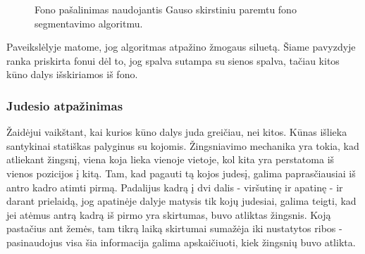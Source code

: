 \documentclass{VUMIFPSbakalaurinis}
\begin{document}
\begin{figure}[H]
    \centering
    \qquad
    \caption{Fono pašalinimas naudojantis Gauso skirstiniu paremtu fono segmentavimo algoritmu.}
    \label{fig:example}
\end{figure}


Paveikslėlyje matome, jog algoritmas atpažino žmogaus siluetą. Šiame pavyzdyje ranka priskirta fonui dėl to, jog spalva sutampa su sienos spalva, tačiau kitos kūno dalys išskiriamos iš fono.

\subsubsection{Judesio atpažinimas}

Žaidėjui vaikštant, kai kurios kūno dalys juda greičiau, nei kitos. Kūnas išlieka santykinai statiškas palyginus su kojomis. Žingsniavimo mechanika yra tokia, kad atliekant žingsnį, viena koja lieka vienoje vietoje, kol kita yra perstatoma iš vienos pozicijos į kitą. Tam, kad pagauti tą kojos judesį, galima paprasčiausiai iš antro kadro atimti pirmą. Padalijus kadrą į dvi dalis - viršutinę ir apatinę - ir darant prielaidą, jog apatinėje dalyje matysis tik kojų judesiai, galima teigti, kad jei atėmus antrą kadrą iš pirmo yra skirtumas, buvo atliktas žingsnis. Koją pastačius ant žemės, tam tikrą laiką skirtumai sumažėja iki nustatytos ribos - pasinaudojus visa šia informacija galima apskaičiuoti, kiek žingsnių buvo atlikta. 
\end{document}
